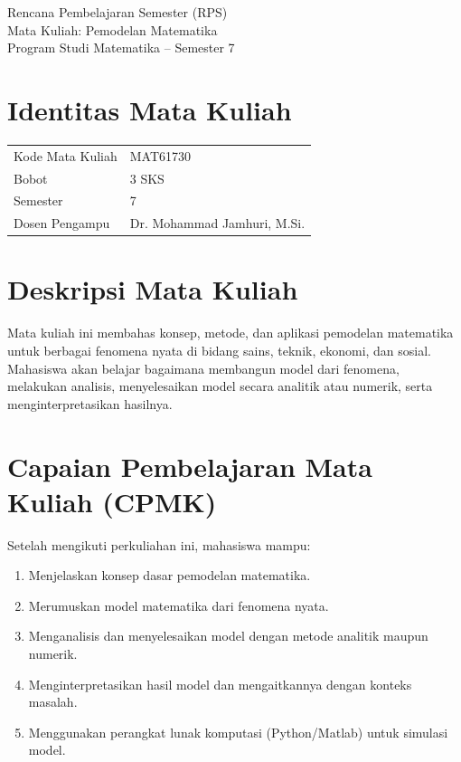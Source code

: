 \documentclass{bukumjh}
\begin{document}
\frontmatter

\insertsampuldalam
\insertcopyrightpage
\insertkatapengantar

\begin{center}
\Large {\jsg Rencana Pembelajaran Semester (RPS)} \\[0.2cm]
\large Mata Kuliah: {\jsg Pemodelan Matematika} \\
Program Studi Matematika – Semester 7 \\
\end{center}

\section*{Identitas Mata Kuliah}
\begin{tabular}{ll}
Kode Mata Kuliah & MAT61730 \\
Bobot & 3 SKS \\
Semester & 7 \\
Dosen Pengampu & Dr. Mohammad Jamhuri, M.Si. \\
\end{tabular}

\section*{Deskripsi Mata Kuliah}
Mata kuliah ini membahas konsep, metode, dan aplikasi pemodelan matematika untuk berbagai fenomena nyata di bidang sains, teknik, ekonomi, dan sosial. Mahasiswa akan belajar bagaimana membangun model dari fenomena, melakukan analisis, menyelesaikan model secara analitik atau numerik, serta menginterpretasikan hasilnya. 

\section*{Capaian Pembelajaran Mata Kuliah (CPMK)}
Setelah mengikuti perkuliahan ini, mahasiswa mampu:
\begin{enumerate}
    \item Menjelaskan konsep dasar pemodelan matematika.
    \item Merumuskan model matematika dari fenomena nyata.
    \item Menganalisis dan menyelesaikan model dengan metode analitik maupun numerik.
    \item Menginterpretasikan hasil model dan mengaitkannya dengan konteks masalah.
    \item Menggunakan perangkat lunak komputasi (Python/Matlab) untuk simulasi model.
\end{enumerate}
\end{document}
